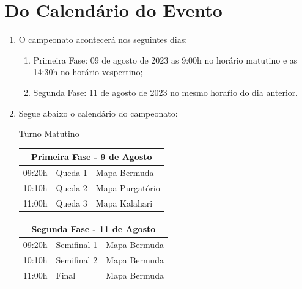 \section*{Do Calendário do Evento}

\begin{enumerate}[start=1,label={\bfseries Art. \arabic*$^\circ$ - }, resume]
    \item O campeonato acontecerá nos seguintes dias:
        \begin{enumerate}[label={\bfseries \Roman* - }]
            \item Primeira Fase: 09 de agosto de 2023 as 9:00h no horário matutino
                e as 14:30h no horário vespertino;
            \item Segunda Fase: 11 de agosto de 2023 no mesmo horaŕio do dia anterior.
        \end{enumerate}
    \item Segue abaixo o calendário do campeonato:

    \begin{center}
        Turno Matutino
    \end{center}
    \begin{multicols}{2}
        \begin{flushleft}
            \begin{tabular}{l l l}
                \hline
                \multicolumn{3}{c}{Primeira Fase - 9 de Agosto}\\
                \hline
                09:20h & Queda 1 & Mapa Bermuda \\
                10:10h & Queda 2 & Mapa Purgatório \\
                11:00h & Queda 3 & Mapa Kalahari\\
                \hline
            \end{tabular}
        \end{flushleft}

        \begin{flushleft}
            \begin{tabular}{l l l}
                \hline
                \multicolumn{3}{c}{Segunda Fase - 11 de Agosto}\\
                \hline
                09:20h & Semifinal 1 & Mapa Bermuda\\
                10:10h & Semifinal 2 & Mapa Bermuda\\
                11:00h & Final & Mapa Bermuda\\
                \hline
            \end{tabular}
        \end{flushleft}
    \end{multicols}


\end{enumerate}

